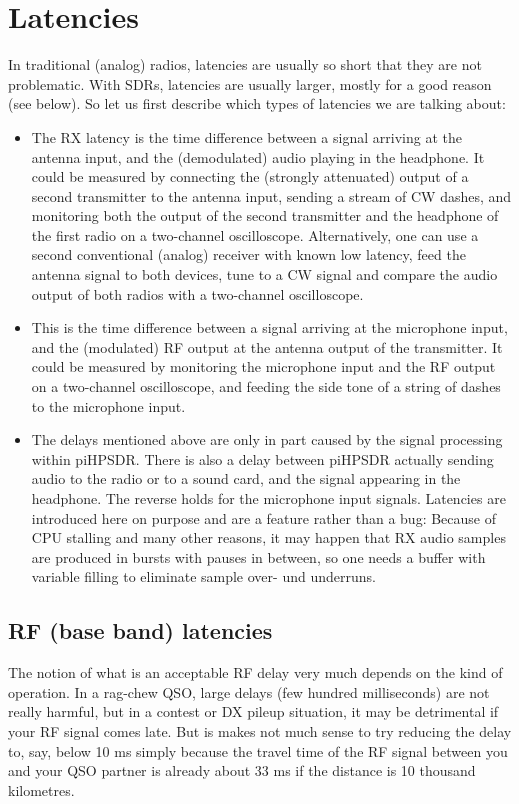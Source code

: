 \documentclass[12pt]{book}
\def\pH{pi\-HPSDR\xspace}
\begin{document}
\chapter{Latencies}
\label{sec:latencies}
In traditional (analog) radios, latencies are usually so short that they are not problematic. With
SDRs, latencies are usually larger, mostly for a good reason (see below). So let us first describe which
types of latencies we are talking about:

\begin{itemize}
\item[RX]
{The RX latency is the time difference between a signal arriving at the antenna input, and the (demodulated) audio
playing in the headphone. It could be measured by connecting the (strongly attenuated) output of a
second transmitter to the antenna input, sending a stream of CW dashes, and monitoring both the output
of the second transmitter and the headphone of the first radio on a two-channel oscilloscope. Alternatively,
one can use a second conventional (analog) receiver with known low latency, feed the antenna signal
to both devices, tune to a CW signal and compare the audio output of both radios with a two-channel
oscilloscope.}
\item[TX]
{This is the time difference between a signal arriving at the microphone input, and the (modulated)
RF output at the antenna output of the transmitter. It could be measured by monitoring the microphone
input and the RF output on a two-channel oscilloscope, and feeding the side tone of a string of dashes
to the microphone input.}

\item[Audio]
{The delays mentioned above are only in part caused by the signal processing within \pH.
There is also a delay between \pH actually sending audio to the radio or to a sound card,
and the signal appearing in the headphone. The reverse holds for the microphone input signals.
Latencies are introduced here on purpose and are a feature rather than a bug: Because of
CPU stalling and many other reasons, it may happen that RX audio samples are produced in
bursts with pauses in between, so one needs a buffer with variable filling to eliminate
sample over- und underruns.}
\end{itemize}

\section{RF (base band) latencies}
The notion of what is an acceptable RF delay very much depends on the kind of operation. In a
rag-chew QSO, large delays (few hundred milliseconds) are not really harmful, but in a
contest or DX pileup situation, it may be detrimental if your RF signal comes late. But is makes
not much sense to try reducing the delay to, say, below 10 ms simply because the travel time
of the RF signal between you and your QSO partner is already
about 33 ms if the distance is 10 thousand kilometres.
\end{document}
